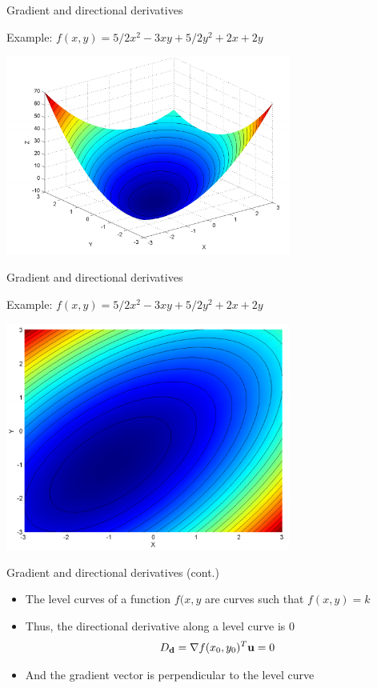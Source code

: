 \documentclass[notes]{beamer}
\providecommand{\tightlist}{%
  \setlength{\itemsep}{0pt}\setlength{\parskip}{0pt}}
\begin{document}
\begin{frame}{Gradient and directional derivatives}

Example: \(f(x,y)=5/2 x^2 -3xy + 5/2 y^2 +2x +2y\)

\centering 

\includegraphics[width=0.70000\textwidth]{2018-03-09-22-31-32.png}\\

\end{frame}

\begin{frame}{Gradient and directional derivatives}

Example: \(f(x,y)=5/2 x^2 -3xy + 5/2 y^2 +2x +2y\)

\centering 

\includegraphics[width=0.70000\textwidth]{2018-03-09-22-34-05.png}\\

\end{frame}

\begin{frame}{Gradient and directional derivatives (cont.)}

\begin{itemize}
\tightlist
\item
  The level curves of a function \(f(x,y\) are curves such that
  \(f(x,y)=k\)
\item
  Thus, the directional derivative along a level curve is 0
  \[D_{\mathbf{d}} = \nabla f(x_0,y_0) ^T \mathbf{u} = 0 \]
\item
  And the gradient vector is perpendicular to the level curve
\end{itemize}

\end{frame}
\end{document}
